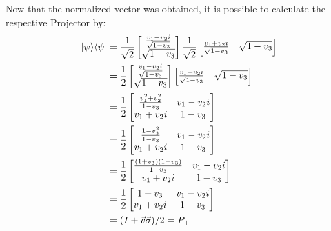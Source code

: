 Now that the normalized vector was obtained,
it is possible to calculate the respective Projector by:
\begin{align}
    \mathop{\mathinner{ |{\psi}\rangle \langle{\psi}|}} &= \frac{1}{\sqrt2}
        \left[ \begin{matrix}
            \frac{v_1 - v_2i}{\sqrt{1 - v_3}} \\
            \sqrt{1 - v_3}
        \end{matrix} \right]
        \frac{1}{\sqrt2}
        \left[ \begin{matrix}
            \frac{v_1 + v_2i}{\sqrt{1 - v_3}} &
            \sqrt{1 - v_3}
        \end{matrix} \right] \\
    &= \frac{1}{2} \left[ \begin{matrix}
            \frac{v_1 - v_2i}{\sqrt{1 - v_3}} \\
            \sqrt{1 - v_3}
        \end{matrix} \right]
        \left[ \begin{matrix}
            \frac{v_1 + v_2i}{\sqrt{1 - v_3}} &
            \sqrt{1 - v_3}
        \end{matrix} \right] \\
    &= \frac{1}{2} \left[ \begin{matrix}
        \frac{v_1^2 + v_2^2}{1 - v_3} & v_1 - v_2i \\
        v_1 + v_2i & 1 - v_3
        \end{matrix} \right] \\
    &= \frac{1}{2} \left[ \begin{matrix}
        \frac{1 - v_3^2}{1 - v_3} & v_1 - v_2i \\
        v_1 + v_2i & 1 - v_3
        \end{matrix} \right] \\
    &= \frac{1}{2} \left[ \begin{matrix}
        \frac{(1 + v_3)(1 - v_3)}{1 - v_3} & v_1 - v_2i \\
        v_1 + v_2i & 1 - v_3
        \end{matrix} \right] \\
    &= \frac{1}{2} \left[ \begin{matrix}
        1 + v_3 & v_1 - v_2i \\
        v_1 + v_2i & 1 - v_3
        \end{matrix} \right] \\
    &= (I + \vec{v} \vec{\sigma}) / 2 = P_+
\end{align}

